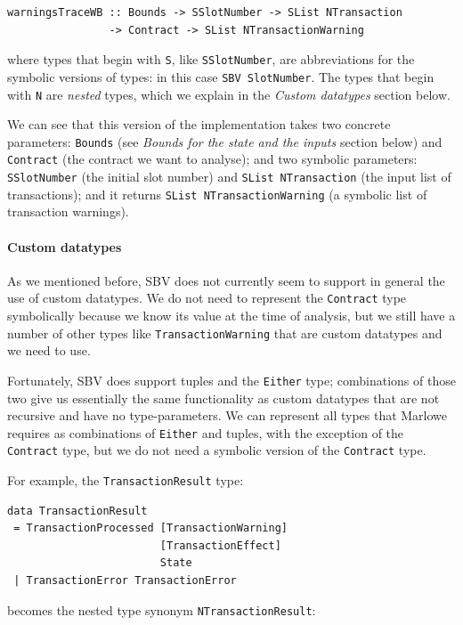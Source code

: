 \documentclass[runningheads]{llncs}
\begin{document}
\begin{verbatim}
warningsTraceWB :: Bounds -> SSlotNumber -> SList NTransaction
                -> Contract -> SList NTransactionWarning
\end{verbatim}

\noindent
where types that begin with \texttt{S}, like \texttt{SSlotNumber}, are abbreviations for the symbolic versions of types: in this case \texttt{SBV SlotNumber}.
The types that begin with \texttt{N} are \textit{nested} types, which we explain in the \textit{Custom datatypes} section below.

We can see that this version of the implementation takes two concrete parameters: \texttt{Bounds} (see \textit{Bounds for the state and the inputs} section below) and \texttt{Contract} (the contract we want to analyse); and two symbolic parameters: \texttt{SSlotNumber} (the initial slot number) and \texttt{SList NTransaction} (the input list of transactions); and it returns \texttt{SList NTransactionWarning} (a symbolic list of transaction warnings).

\paragraph{Custom datatypes}

As we mentioned before, SBV does not currently seem to support in general the use of custom datatypes. We do not need to represent the \texttt{Contract} type symbolically because we know its value at the time of analysis, but we still have a number of other types like \texttt{TransactionWarning} that are custom datatypes and we need to use.

Fortunately, SBV does support tuples and the \texttt{Either} type; combinations of those two give us essentially the same functionality as custom datatypes that are not recursive and have no type-parameters. We can represent all types that Marlowe requires as combinations of \texttt{Either} and tuples, with the exception of the \texttt{Contract} type, but we do not need a symbolic version of the \texttt{Contract} type.

\noindent
For example, the \texttt{TransactionResult} type:
\begin{verbatim}
data TransactionResult
 = TransactionProcessed [TransactionWarning]
                        [TransactionEffect]
                        State
 | TransactionError TransactionError
\end{verbatim}
\noindent
becomes the nested type synonym \texttt{NTransactionResult}:
\end{document}
